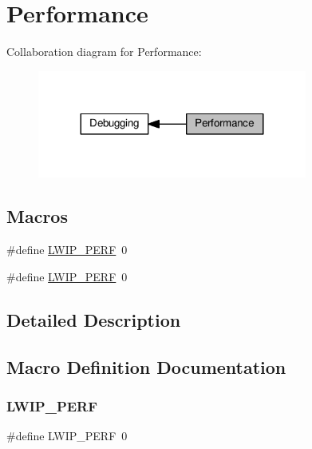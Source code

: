 \hypertarget{group__lwip__opts__perf}{}\section{Performance}
\label{group__lwip__opts__perf}
Collaboration diagram for Performance\+:
\nopagebreak
\begin{figure}[H]
\begin{center}
\leavevmode
\includegraphics[width=251pt]{group__lwip__opts__perf}
\end{center}
\end{figure}
\subsection*{Macros}
\begin{DoxyCompactItemize}
\item 
\#define \hyperlink{group__lwip__opts__perf_ga44acd95b33e2d58a74455279721298de}{L\+W\+I\+P\+\_\+\+P\+E\+RF}~0
\item 
\#define \hyperlink{group__lwip__opts__perf_ga44acd95b33e2d58a74455279721298de}{L\+W\+I\+P\+\_\+\+P\+E\+RF}~0
\end{DoxyCompactItemize}


\subsection{Detailed Description}


\subsection{Macro Definition Documentation}
\mbox{\label{group__lwip__opts__perf_ga44acd95b33e2d58a74455279721298de}} 
\subsubsection{\texorpdfstring{L\+W\+I\+P\+\_\+\+P\+E\+RF}{LWIP\_PERF}\hspace{0.1cm}{\footnotesize\ttfamily [1/2]}}
{\footnotesize\ttfamily \#define L\+W\+I\+P\+\_\+\+P\+E\+RF~0}

